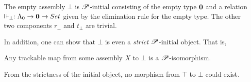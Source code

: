 \documentclass[a4paper,UKenglish,numberwithinsect,cleveref,thm-restate]{lipics-v2021}
\numberwithin{equation}{section}
\theoremstyle{definition}
\theoremstyle{plain}
\begin{document}
\begin{example}
The empty assembly $\bot$ is $\mathscr{P}$-initial consisting of the empty type $\mathbf{0}$ and a relation $\Vdash_\bot : \Lambda_0 \to \Empty \to \set$ given by the elimination rule for the empty type.
The other two components $r_\bot$ and $t_\bot$ are trivial.
\end{example}

In addition, one can show that $\bot$ is even a \emph{strict} $\mathscr{P}$-initial object. That is, 
\begin{proposition}\label{prop:strict-initial}
  Any trackable map from some assembly $X$ to $\bot$ is a $\mathscr{P}$-isomorphism. 
\end{proposition}
From the strictness of the initial object, no morphism from $\top$ to $\bot$ could exist.
\end{document}
